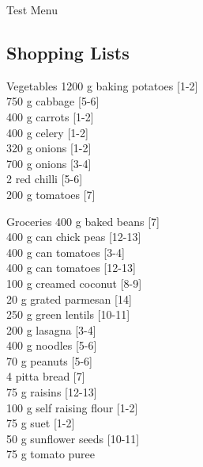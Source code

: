 \begin{menu}{Test Menu}
    \subsection*{Shopping Lists}
      \begin{shoppinglist}{Vegetables}
      1200 g baking potatoes 
        {\scriptsize[1-2]}\\
      750 g cabbage 
        {\scriptsize[5-6]}\\
      400 g carrots 
        {\scriptsize[1-2]}\\
      400 g celery 
        {\scriptsize[1-2]}\\
      320 g onions 
        {\scriptsize[1-2]}\\
      700 g onions 
        {\scriptsize[3-4]}\\
      2  red chilli 
        {\scriptsize[5-6]}\\
      200 g tomatoes 
        {\scriptsize[7]}\\
      \end{shoppinglist}%
      \begin{shoppinglist}{Groceries}
      400 g baked beans 
        {\scriptsize[7]}\\
      400 g can chick peas 
        {\scriptsize[12-13]}\\
      400 g can tomatoes 
        {\scriptsize[3-4]}\\
      400 g can tomatoes 
        {\scriptsize[12-13]}\\
      100 g creamed coconut 
        {\scriptsize[8-9]}\\
      20 g grated parmesan 
        {\scriptsize[14]}\\
      250 g green lentils 
        {\scriptsize[10-11]}\\
      200 g lasagna 
        {\scriptsize[3-4]}\\
      400 g noodles 
        {\scriptsize[5-6]}\\
      70 g peanuts 
        {\scriptsize[5-6]}\\
      4  pitta bread 
        {\scriptsize[7]}\\
      75 g raisins 
        {\scriptsize[12-13]}\\
      100 g self raising flour 
        {\scriptsize[1-2]}\\
      75 g suet 
        {\scriptsize[1-2]}\\
      50 g sunflower seeds 
        {\scriptsize[10-11]}\\
      75 g tomato puree 

\end{shoppinglist}
\end{menu}
